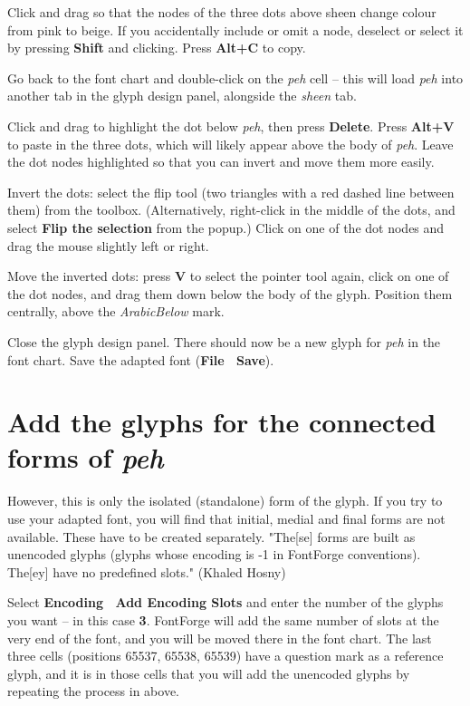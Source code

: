 Click and drag so that the nodes of the three dots above sheen change colour from pink to beige.  If you accidentally include or omit a node, deselect or select it by pressing \textbf{Shift} and clicking.  Press \textbf{Alt+C} to copy.

Go back to the font chart and double-click on the \textit{peh} cell -- this will load \textit{peh} into another tab in the glyph design panel, alongside the \textit{sheen} tab.

Click and drag to highlight the dot below \textit{peh}, then press \textbf{Delete}.  Press \textbf{Alt+V} to paste in the three dots, which will likely appear above the body of \textit{peh}.  Leave the dot nodes highlighted so that you can invert and move them more easily.

Invert the dots: select the flip tool (two triangles with a red dashed line between them) from the toolbox.  (Alternatively, right-click in the middle of the dots, and select \textbf{Flip the selection} from the popup.)  Click on one of the dot nodes and drag the mouse slightly left or right.

Move the inverted dots: press \textbf{V} to select the pointer tool again, click on one of the dot nodes, and drag them down below the body of the glyph.  Position them centrally, above the \textit{ArabicBelow} mark.

Close the glyph design panel. There should now be a new glyph for \textit{peh} in the font chart.  Save the adapted font (\textbf{File \textrightarrow\ Save}).

\section{Add the glyphs for the connected forms of \textit{peh}}

However, this is only the isolated (standalone) form of the glyph.  If you try to use your adapted font, you will find that initial, medial and final forms are not available.  These have to be created separately.  "The[se] forms are built as unencoded glyphs (glyphs whose encoding is -1 in FontForge conventions).  The[ey] have no predefined slots." (Khaled Hosny)

Select \textbf{Encoding \textrightarrow\ Add Encoding Slots} and enter the number of the glyphs you want -- in this case \textbf{3}.  FontForge will add the same number of slots at the very end of the font, and you will be moved there in the font chart.  The last three cells (positions 65537, 65538, 65539) have a question mark as a reference glyph, and it is in those cells that you will add the unencoded glyphs by repeating the process in  above.

